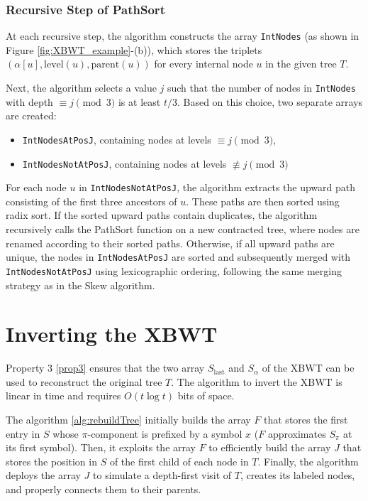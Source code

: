 \subsubsection{Recursive Step of PathSort}
At each recursive step, the algorithm constructs the array \texttt{IntNodes} (as shown in Figure \ref{fig:XBWT_example}-(b)), which stores the triplets $(\alpha[u], \text{level}(u), \text{parent}(u))$ for every internal node $u$ in the given tree $T$.  

Next, the algorithm selects a value $j$ such that the number of nodes in \texttt{IntNodes} with depth $\equiv j \pmod{3}$ is at least $t/3$. Based on this choice, two separate arrays are created:  
\begin{itemize}
    \item \texttt{IntNodesAtPosJ}, containing nodes at levels $\equiv j \pmod{3}$,
    \item \texttt{IntNodesNotAtPosJ}, containing nodes at levels $\not\equiv j \pmod{3}$
\end{itemize}

For each node $u$ in \texttt{IntNodesNotAtPosJ}, the algorithm extracts the upward path consisting of the first three ancestors of $u$. These paths are then sorted using radix sort. If the sorted upward paths contain duplicates, the algorithm recursively calls the PathSort function on a new contracted tree, where nodes are renamed according to their sorted paths. Otherwise, if all upward paths are unique, the nodes in \texttt{IntNodesAtPosJ} are sorted and subsequently merged with \texttt{IntNodesNotAtPosJ} using lexicographic ordering, following the same merging strategy as in the Skew algorithm.

\section{Inverting the XBWT}
Property 3 \ref{prop3} ensures that the two array $S_{\text{last}}$ and $S_{\alpha}$ of the XBWT can be used to reconstruct the original tree $T$. The algorithm to invert the XBWT is linear in time and requires $O(t \log t)$ bits of space.

The algorithm \ref{alg:rebuildTree} initially builds the array $F$ that stores the first entry in $S$ whose $\pi$-component is prefixed by a symbol $x$ ($F$ approximates $S_{\pi}$ at its first symbol). Then, it exploits the array $F$ to efficiently build the array $J$ that stores the position in $S$ of the first child of each node in $T$. Finally, the algorithm deploys the array $J$ to
simulate a depth-first visit of $T$, creates its labeled nodes, and properly connects them to their parents. 

